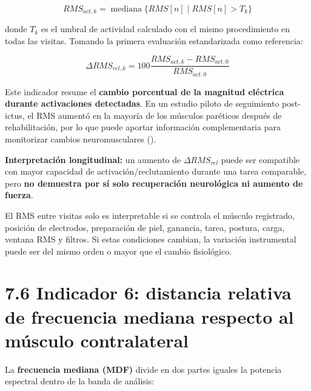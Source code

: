 \documentclass[
  spanish,
  a4paper,
  DIV=11,
  numbers=noendperiod]{scrreprt}
\begin{document}
\[
RMS_{act,k}=\operatorname{mediana}\{RMS[n]\;|\;RMS[n]>T_k\}
\]

donde \(T_k\) es el umbral de actividad calculado con el mismo
procedimiento en todas las visitas. Tomando la primera evaluación
estandarizada como referencia:

\[
\Delta RMS_{rel,k}=100\frac{RMS_{act,k}-RMS_{act,0}}{RMS_{act,0}}
\]

Este indicador resume el \textbf{cambio porcentual de la magnitud
eléctrica durante activaciones detectadas}. En un estudio piloto de
seguimiento post-ictus, el RMS aumentó en la mayoría de los músculos
paréticos después de rehabilitación, por lo que puede aportar
información complementaria para monitorizar cambios neuromusculares
().

\textbf{Interpretación longitudinal:} un aumento de \(\Delta RMS_{rel}\)
puede ser compatible con mayor capacidad de activación/reclutamiento
durante una tarea comparable, pero \textbf{no demuestra por sí solo
recuperación neurológica ni aumento de fuerza}.

\begin{tcolorbox}[enhanced jigsaw, arc=.35mm, bottomrule=.15mm, bottomtitle=1mm, breakable, colback=white, colbacktitle=quarto-callout-warning-color!10!white, colframe=quarto-callout-warning-color-frame, coltitle=black, left=2mm, leftrule=.75mm, opacityback=0, opacitybacktitle=0.6, rightrule=.15mm, title=\textcolor{quarto-callout-warning-color}{\faExclamationTriangle}\hspace{0.5em}{Advertencia metodológica}, titlerule=0mm, toprule=.15mm, toptitle=1mm]

El RMS entre visitas solo es interpretable si se controla el músculo
registrado, posición de electrodos, preparación de piel, ganancia,
tarea, postura, carga, ventana RMS y filtros. Si estas condiciones
cambian, la variación instrumental puede ser del mismo orden o mayor que
el cambio fisiológico.

\end{tcolorbox}

\section{7.6 Indicador 6: distancia relativa de frecuencia mediana
respecto al músculo
contralateral}\label{indicador-6-distancia-relativa-de-frecuencia-mediana-respecto-al-muxfasculo-contralateral}

La \textbf{frecuencia mediana (MDF)} divide en dos partes iguales la
potencia espectral dentro de la banda de análisis:
\end{document}
